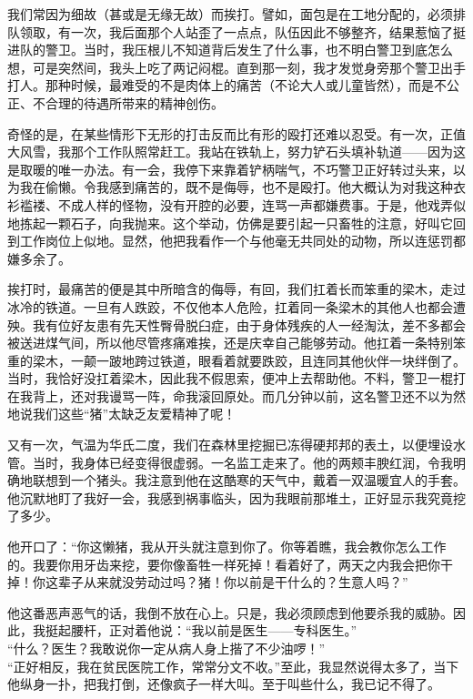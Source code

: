 \documentclass[11pt,oneside]{book}
\begin{document}
\begin{common-format}
我们常因为细故（甚或是无缘无故）而挨打。譬如，面包是在工地分配的，必须排队领取，有一次，我后面那个人站歪了一点点，队伍因此不够整齐，结果惹恼了挺进队的警卫。当时，我压根儿不知道背后发生了什么事，也不明白警卫到底怎么想，可是突然间，我头上吃了两记闷棍。直到那一刻，我才发觉身旁那个警卫出手打人。那种时候，最难受的不是肉体上的痛苦（不论大人或儿童皆然），而是不公正、不合理的待遇所带来的精神创伤。

奇怪的是，在某些情形下无形的打击反而比有形的殴打还难以忍受。有一次，正值大风雪，我那个工作队照常赶工。我站在铁轨上，努力铲石头填补轨道——因为这是取暖的唯一办法。有一会，我停下来靠着铲柄喘气，不巧警卫正好转过头来，以为我在偷懒。令我感到痛苦的，既不是侮辱，也不是殴打。他大概认为对我这种衣衫褴褛、不成人样的怪物，没有开腔的必要，连骂一声都嫌费事。于是，他戏弄似地拣起一颗石子，向我抛来。这个举动，仿佛是要引起一只畜牲的注意，好叫它回到工作岗位上似地。显然，他把我看作一个与他毫无共同处的动物，所以连惩罚都嫌多余了。

挨打时，最痛苦的便是其中所暗含的侮辱，有回，我们扛着长而笨重的梁木，走过冰冷的铁道。一旦有人跌跤，不仅他本人危险，扛着同一条梁木的其他人也都会遭殃。我有位好友患有先天性臀骨脱臼症，由于身体残疾的人一经淘汰，差不多都会被送进煤气间，所以他尽管疼痛难挨，还是庆幸自己能够劳动。他扛着一条特别笨重的梁木，一颠一跛地跨过铁道，眼看着就要跌跤，且连同其他伙伴一块绊倒了。当时，我恰好没扛着梁木，因此我不假思索，便冲上去帮助他。不料，警卫一棍打在我背上，还对我谩骂一阵，命我滚回原处。而几分钟以前，这名警卫还不以为然地说我们这些“猪”太缺乏友爱精神了呢！

又有一次，气温为华氏二度，我们在森林里挖掘已冻得硬邦邦的表土，以便埋设水管。当时，我身体已经变得很虚弱。一名监工走来了。他的两颊丰腴红润，令我明确地联想到一个猪头。我注意到他在这酷寒的天气中，戴着一双温暖宜人的手套。他沉默地盯了我好一会，我感到祸事临头，因为我眼前那堆土，正好显示我究竟挖了多少。

他开口了：“你这懒猪，我从开头就注意到你了。你等着瞧，我会教你怎么工作的。我要你用牙齿来挖，要你像畜牲一样死掉！看着好了，两天之内我会把你干掉！你这辈子从来就没劳动过吗？猪！你以前是干什么的？生意人吗？”

他这番恶声恶气的话，我倒不放在心上。只是，我必须顾虑到他要杀我的威胁。因此，我挺起腰杆，正对着他说：“我以前是医生——专科医生。”\\
\indent“什么？医生？我敢说你一定从病人身上揩了不少油啰！”\\
\indent“正好相反，我在贫民医院工作，常常分文不收。”至此，我显然说得太多了，当下他纵身一扑，把我打倒，还像疯子一样大叫。至于叫些什么，我已记不得了。


\end{common-format}
\end{document}
